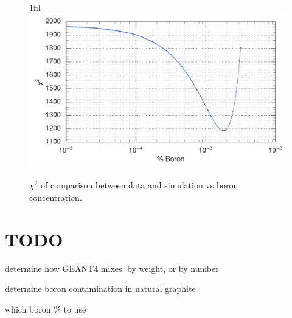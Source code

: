 \documentclass{article}
\makeatletter
\newcommand*{\centerfloat}{%
  \parindent \z@
  \leftskip \z@ \@plus 1fil \@minus \textwidth
  \rightskip\leftskip
  \parfillskip \z@skip}
\makeatother
\begin{document}
\begin{figure}
	\centerfloat
	\includegraphics[width=\columnwidth]{images/ChiSqVsBoron}
	\caption{$\chi^2$ of comparison between data and simulation vs boron concentration.}	
	\label{fig:ChiSq}
\end{figure}


\section{TODO}

determine how GEANT4 mixes: by weight, or by number

determine boron contamination in natural graphite

which boron \% to use









\clearpage
	
	
\end{document}
